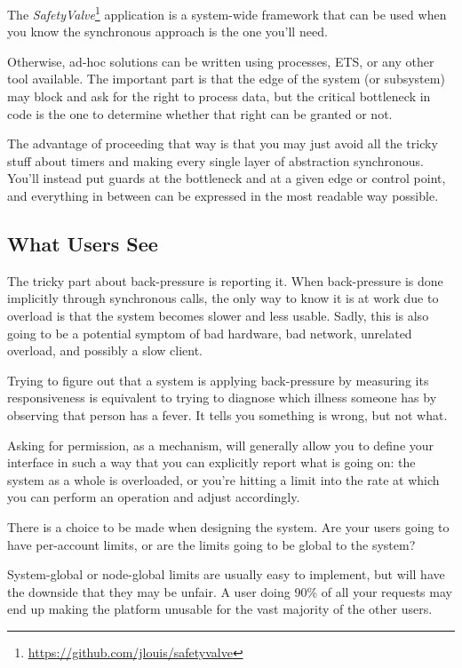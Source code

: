 \documentclass[11pt, oneside]{book}   	%
\begin{document}
The \emph{SafetyValve}\footnote{\href{https://github.com/jlouis/safetyvalve}{https://github.com/jlouis/safetyvalve}} application is a system-wide framework that can be used when you know the synchronous approach is the one you'll need.

Otherwise, ad-hoc solutions can be written using processes, ETS, or any other tool available. The important part is that the edge of the system (or subsystem) may block and ask for the right to process data, but the critical bottleneck in code is the one to determine whether that right can be granted or not.

The advantage of proceeding that way is that you may just avoid all the tricky stuff about timers and making every single layer of abstraction synchronous. You'll instead put guards at the bottleneck and at a given edge or control point, and everything in between can be expressed in the most readable way possible.

\subsection{What Users See}

The tricky part about back-pressure is reporting it. When back-pressure is done implicitly through synchronous calls, the only way to know it is at work due to overload is that the system becomes slower and less usable. Sadly, this is also going to be a potential symptom of bad hardware, bad network, unrelated overload, and possibly a slow client.

Trying to figure out that a system is applying back-pressure by measuring its responsiveness is equivalent to trying to diagnose which illness someone has by observing that person has a fever. It tells you something is wrong, but not what.

Asking for permission, as a mechanism, will generally allow you to define your interface in such a way that you can explicitly report what is going on: the system as a whole is overloaded, or you're hitting a limit into the rate at which you can perform an operation and adjust accordingly.

There is a choice to be made when designing the system. Are your users going to have per-account limits, or are the limits going to be global to the system?

System-global or node-global limits are usually easy to implement, but will have the downside that they may be unfair. A user doing 90\% of all your requests may end up making the platform unusable for the vast majority of the other users.
\end{document}

